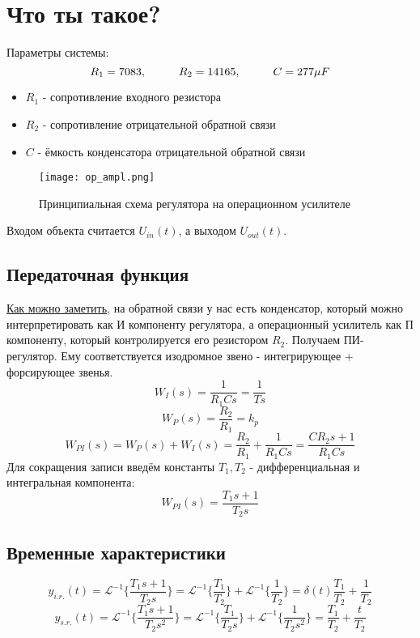 \chapter{Что ты такое?}
\label{ch:chap5}
Параметры системы:
$$
    R_1 = 7083, \hspace*{1cm} R_2 = 14165, \hspace*{1cm} C = 277\mu F
$$
\begin{itemize}
    \item $R_1$  - сопротивление входного резистора
    \item $R_2$  - сопротивление отрицательной обратной связи
    \item $C$  - ёмкость конденсатора отрицательной обратной связи
\end{itemize}

\begin{figure}[ht]
  \centering
  \texttt{[image: op\_ampl.png]}
  \caption{Принципиальная схема регулятора на операционном усилителе}
\end{figure}

Входом объекта считается $U_{in}(t)$, а выходом $U_{out}(t)$. 

\section{Передаточная функция}
\href{https://gg0715.narod.ru/esa/13.html}{Как можно заметить}, на обратной связи у нас есть конденсатор, который можно интерпретировать как И компоненту регулятора, а операционный усилитель как П компоненту, который контролируется его резистором $R_2$. Получаем ПИ-регулятор.
Ему соответствуется изодромное звено - интегрирующее + форсирующее звенья.
$$
W_{I}(s) = \frac{1}{R_1 Cs} = \frac{1}{Ts}
$$
$$
W_{P}(s) = \frac{R_2}{R_1} = k_p
$$
$$
W_{PI}(s) = W_P(s) + W_I(s) = \frac{R_2}{R_1} + \frac{1}{R_1 Cs} = \frac{CR_2 s + 1}{R_1Cs}
$$
Для сокращения записи введём константы $T_1, T_2$ - дифференциальная и интегральная компонента:
$$
W_{PI}(s) = \frac{T_1s + 1}{T_2 s}
$$

\section{Временные  характеристики}
$$
y_{i.r.}(t) = \mathcal{L}^{-1}\{ \frac{T_1s + 1}{T_2 s}  \} = \mathcal{L}^{-1}\{ \frac{T_1}{T_2}\} + \mathcal{L}^{-1}\{ \frac{1}{T_2}\} = \delta (t)\frac{T_1}{T_2} + \frac{1}{T_2}
$$
$$
y_{s.r.}(t) =  \mathcal{L}^{-1}\{ \frac{T_1s + 1}{T_2 s^2} \} = \mathcal{L}^{-1}\{ \frac{T_1}{T_2 s}\} + \mathcal{L}^{-1}\{ \frac{1}{T_2 s^2}\} = \frac{T_1}{T_2} + \frac{t}{T_2}
$$


